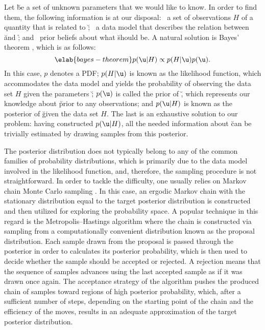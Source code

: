 Let \u be a set of unknown parameters that we would like to know. In order to
find them, the following information is at our disposal: \one~a set of
observations $H$ of a quantity \h that is related to \u; \two~a data model that
describes the relation between \u and \h; and \three~prior beliefs about what \u
should be. A natural solution is Bayes' theorem \cite{gelman2013}, which is as
follows:
\begin{equation} \elab{bayes-theorem}
  p(\u | H) \propto p(H | \u) p(\u).
\end{equation}
In this case, $p$ denotes a \ac{PDF}; $p(H | \u)$ is known as the likelihood
function, which accommodates the data model and yields the probability of
observing the data set $H$ given the parameters \u; $p(\u)$ is called the prior
of \u, which represents our knowledge about \u prior to any observations; and
$p(\u | H)$ is known as the posterior of \u given the data set $H$. The last is
an exhaustive solution to our problem: having constructed $p(\u | H)$, all the
needed information about \u can be trivially estimated by drawing samples from
this posterior.

The posterior distribution does not typically belong to any of the common
families of probability distributions, which is primarily due to the data model
involved in the likelihood function, and, therefore, the sampling procedure is
not straightforward. In order to tackle the difficulty, one usually relies on
Markov chain Monte Carlo sampling \cite{gelman2013}. In this case, an ergodic
Markov chain with the stationary distribution equal to the target posterior
distribution is constructed and then utilized for exploring the probability
space. A popular technique in this regard is the Metropolis--Hastings algorithm
where the chain is constructed via sampling from a computationally convenient
distribution known as the proposal distribution. Each sample drawn from the
proposal is passed through the posterior in order to calculates its posterior
probability, which is then used to decide whether the sample should be accepted
or rejected. A rejection means that the sequence of samples advances using the
last accepted sample as if it was drawn once again. The acceptance strategy of
the algorithm pushes the produced chain of samples toward regions of high
posterior probability, which, after a sufficient number of steps, depending on
the starting point of the chain and the efficiency of the moves, results in an
adequate approximation of the target posterior distribution.
